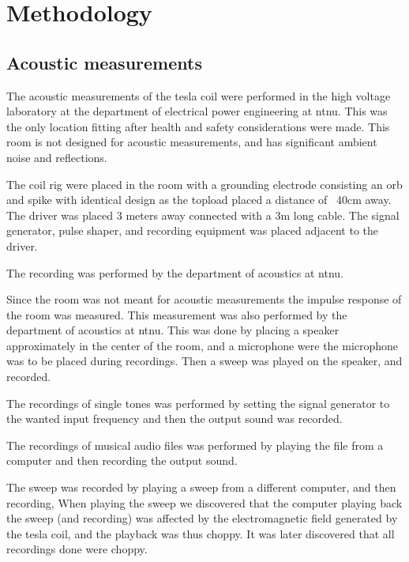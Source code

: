 \section{Methodology}

\subsection{Acoustic measurements}

The acoustic measurements of the tesla coil were performed in the high voltage laboratory at the department of electrical power engineering at ntnu. This was the only location fitting after health and safety considerations were made. This room is not designed for acoustic measurements, and has significant ambient noise and reflections.

The coil rig were placed in the room with a grounding electrode consisting an orb and spike with identical design as the topload placed a distance of ~40cm away. The driver was placed 3 meters away connected with a 3m long cable. The signal generator, pulse shaper, and recording equipment was placed adjacent to the driver.

The recording was performed by the department of acoustics at ntnu.

Since the room was not meant for acoustic measurements the impulse response of the room was measured. This measurement was also performed by the department of acoustics at ntnu. This was done by placing a speaker approximately in the center of the room, and a microphone were the microphone was to be placed during recordings. Then a sweep was played on the speaker, and recorded.

The recordings of single tones was performed by setting the signal generator to the wanted input frequency and then the output sound was recorded.

The recordings of musical audio files was performed by playing the file from a computer and then recording the output sound.

The sweep was recorded by playing a sweep from a different computer, and then recording, When playing the sweep we discovered that the computer playing back the sweep (and recording) was affected by the electromagnetic field generated by the tesla coil, and the playback was thus choppy. It was later discovered that all recordings done were choppy.






